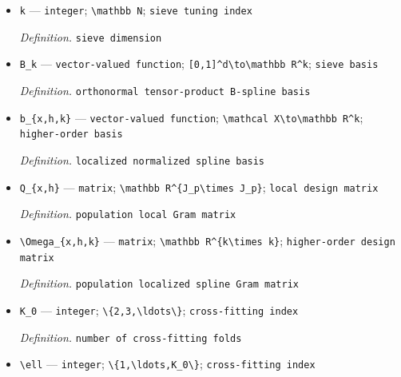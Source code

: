 \documentclass{article}
\begin{document}
\begin{itemize}
  \item \texttt{k} --- \texttt{integer}; \texttt{\textbackslash{}\allowbreak{}mathbb N}; \texttt{sieve tuning index}
  \par\smallskip\noindent\emph{Definition.} \texttt{sieve dimension}
  \item \texttt{B\_\allowbreak{}k} --- \texttt{vector-\allowbreak{}valued function}; \texttt{[0,\allowbreak{}1]\textasciicircum{}d\textbackslash{}\allowbreak{}to\textbackslash{}\allowbreak{}mathbb R\textasciicircum{}k}; \texttt{sieve basis}
  \par\smallskip\noindent\emph{Definition.} \texttt{orthonormal tensor-\allowbreak{}product B-\allowbreak{}spline basis}
  \item \texttt{b\_\allowbreak{}\{x,\allowbreak{}h,\allowbreak{}k\}\allowbreak{}} --- \texttt{vector-\allowbreak{}valued function}; \texttt{\textbackslash{}\allowbreak{}mathcal X\textbackslash{}\allowbreak{}to\textbackslash{}\allowbreak{}mathbb R\textasciicircum{}k}; \texttt{higher-\allowbreak{}order basis}
  \par\smallskip\noindent\emph{Definition.} \texttt{localized normalized spline basis}
  \item \texttt{Q\_\allowbreak{}\{x,\allowbreak{}h\}\allowbreak{}} --- \texttt{matrix}; \texttt{\textbackslash{}\allowbreak{}mathbb R\textasciicircum{}\{J\_\allowbreak{}p\textbackslash{}\allowbreak{}times J\_\allowbreak{}p\}\allowbreak{}}; \texttt{local design matrix}
  \par\smallskip\noindent\emph{Definition.} \texttt{population local Gram matrix}
  \item \texttt{\textbackslash{}\allowbreak{}Omega\_\allowbreak{}\{x,\allowbreak{}h,\allowbreak{}k\}\allowbreak{}} --- \texttt{matrix}; \texttt{\textbackslash{}\allowbreak{}mathbb R\textasciicircum{}\{k\textbackslash{}\allowbreak{}times k\}\allowbreak{}}; \texttt{higher-\allowbreak{}order design matrix}
  \par\smallskip\noindent\emph{Definition.} \texttt{population localized spline Gram matrix}
  \item \texttt{K\_\allowbreak{}0} --- \texttt{integer}; \texttt{\textbackslash{}\allowbreak{}\{2,\allowbreak{}3,\allowbreak{}\textbackslash{}\allowbreak{}ldots\textbackslash{}\allowbreak{}\}\allowbreak{}}; \texttt{cross-\allowbreak{}fitting index}
  \par\smallskip\noindent\emph{Definition.} \texttt{number of cross-\allowbreak{}fitting folds}
  \item \texttt{\textbackslash{}\allowbreak{}ell} --- \texttt{integer}; \texttt{\textbackslash{}\allowbreak{}\{1,\allowbreak{}\textbackslash{}\allowbreak{}ldots,\allowbreak{}K\_\allowbreak{}0\textbackslash{}\allowbreak{}\}\allowbreak{}}; \texttt{cross-\allowbreak{}fitting index}

\end{itemize}
\end{document}
